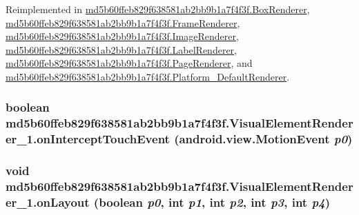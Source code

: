 Reimplemented in \hyperlink{classmd5b60ffeb829f638581ab2bb9b1a7f4f3f_1_1_box_renderer_532fa996338f3b4215d83e4573b83166}{md5b60ffeb829f638581ab2bb9b1a7f4f3f.BoxRenderer}, \hyperlink{classmd5b60ffeb829f638581ab2bb9b1a7f4f3f_1_1_frame_renderer_f5975cde0cd3d4980507d2033988a61d}{md5b60ffeb829f638581ab2bb9b1a7f4f3f.FrameRenderer}, \hyperlink{classmd5b60ffeb829f638581ab2bb9b1a7f4f3f_1_1_image_renderer_68e0694015ee10a62b53a937e6a39a97}{md5b60ffeb829f638581ab2bb9b1a7f4f3f.ImageRenderer}, \hyperlink{classmd5b60ffeb829f638581ab2bb9b1a7f4f3f_1_1_label_renderer_5d58dc5f8f8a367964cfd8fbd30be3f0}{md5b60ffeb829f638581ab2bb9b1a7f4f3f.LabelRenderer}, \hyperlink{classmd5b60ffeb829f638581ab2bb9b1a7f4f3f_1_1_page_renderer_e06757e6f6dff9d51c3f4846c4ccae1f}{md5b60ffeb829f638581ab2bb9b1a7f4f3f.PageRenderer}, and \hyperlink{classmd5b60ffeb829f638581ab2bb9b1a7f4f3f_1_1_platform___default_renderer_b0074968bde1ff3ab9249da5dcda2751}{md5b60ffeb829f638581ab2bb9b1a7f4f3f.Platform\_\-DefaultRenderer}.\hypertarget{classmd5b60ffeb829f638581ab2bb9b1a7f4f3f_1_1_visual_element_renderer__1_f640d27a1867f3d3c63a835f6fd57ecf}{
\subsubsection[{onInterceptTouchEvent}]{\setlength{\rightskip}{0pt plus 5cm}boolean md5b60ffeb829f638581ab2bb9b1a7f4f3f.VisualElementRenderer\_\-1.onInterceptTouchEvent (android.view.MotionEvent {\em p0})}}
\label{classmd5b60ffeb829f638581ab2bb9b1a7f4f3f_1_1_visual_element_renderer__1_f640d27a1867f3d3c63a835f6fd57ecf}


\hypertarget{classmd5b60ffeb829f638581ab2bb9b1a7f4f3f_1_1_visual_element_renderer__1_8c7af843aeec04827cb3a3981ea1978d}{
\subsubsection[{onLayout}]{\setlength{\rightskip}{0pt plus 5cm}void md5b60ffeb829f638581ab2bb9b1a7f4f3f.VisualElementRenderer\_\-1.onLayout (boolean {\em p0}, \/  int {\em p1}, \/  int {\em p2}, \/  int {\em p3}, \/  int {\em p4})}}
\label{classmd5b60ffeb829f638581ab2bb9b1a7f4f3f_1_1_visual_element_renderer__1_8c7af843aeec04827cb3a3981ea1978d}





